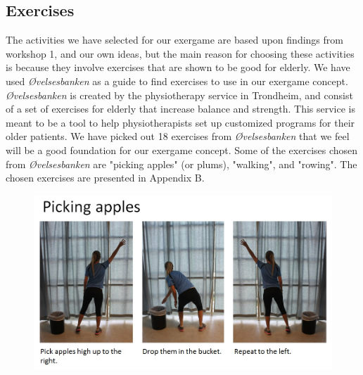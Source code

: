 \subsection{Exercises}
The activities we have selected for our exergame are based upon findings from workshop 1, and our own ideas, but the main reason for choosing these activities is because they involve exercises that are shown to be good for elderly. We have used \emph{Øvelsesbanken} \cite{eldretrening} as a guide to find exercises to use in our exergame concept. \emph{Øvelsesbanken} is created by the physiotherapy service in Trondheim, and consist of a set of exercises for elderly that increase balance and strength. This service is meant to be a tool to help physiotherapists set up customized programs for their older patients. We have picked out 18 exercises from \emph{Øvelsesbanken} that we feel will be a good foundation for our exergame concept. Some of the exercises chosen from \emph{Øvelsesbanken} are "picking apples" (or plums), "walking", and "rowing". The chosen exercises are presented in Appendix B. 


\begin{figure} [H]
\centering
\includegraphics[scale=0.7]{PickingApplesAlone.jpg}
\caption[Exercise - picking apples]{}
\label{pickingapples}
\end{figure}

